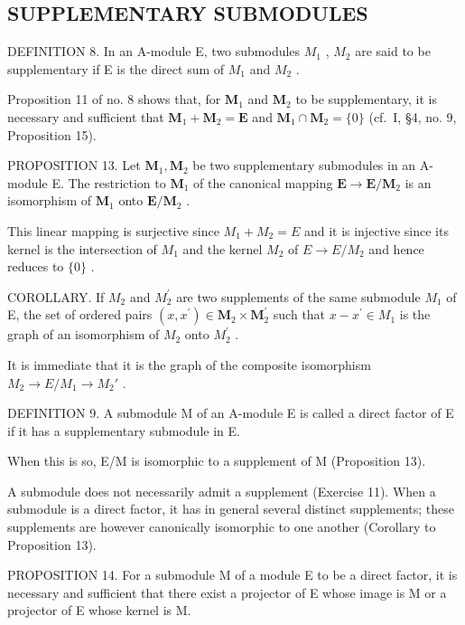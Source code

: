 \subsection{SUPPLEMENTARY SUBMODULES}

DEFINITION 8. In an A-module E, two submodules \(M_{1}\) , \(M_{2}\) are said to be supplementary if E is the direct sum of \(M_{1}\) and \(M_{2}\) .

Proposition 11 of no. 8 shows that, for \(\mathbf{M}_1\) and \(\mathbf{M}_2\) to be supplementary, it is necessary and sufficient that \(\mathbf{M}_1 + \mathbf{M}_2 = \mathbf{E}\) and \(\mathbf{M}_1 \cap \mathbf{M}_2 = \{0\}\) (cf.~I, §4, no. 9, Proposition 15).

PROPOSITION 13. Let \(\mathbf{M}_1, \mathbf{M}_2\) be two supplementary submodules in an A-module E. The restriction to \(\mathbf{M}_1\) of the canonical mapping \(\mathbf{E} \to \mathbf{E} / \mathbf{M}_2\) is an isomorphism of \(\mathbf{M}_1\) onto \(\mathbf{E} / \mathbf{M}_2\) .

This linear mapping is surjective since \(M_{1} + M_{2} = E\) and it is injective since its kernel is the intersection of \(M_{1}\) and the kernel \(M_{2}\) of \(E \rightarrow E/M_{2}\) and hence reduces to \(\{0\}\) .

COROLLARY. If \(M_{2}\) and \(M_{2}^{\prime}\) are two supplements of the same submodule \(M_{1}\) of E, the set of ordered pairs \((x, x^{\prime}) \in \mathbf{M}_{2} \times \mathbf{M}_{2}^{\prime}\) such that \(x - x^{\prime} \in M_{1}\) is the graph of an isomorphism of \(M_{2}\) onto \(M_{2}^{\prime}\) .

It is immediate that it is the graph of the composite isomorphism \(M_{2} \rightarrow E/M_{1} \rightarrow M_{2}'\) .

DEFINITION 9. A submodule M of an A-module E is called a direct factor of E if it has a supplementary submodule in E.

When this is so, E/M is isomorphic to a supplement of M (Proposition 13).

A submodule does not necessarily admit a supplement (Exercise 11). When a submodule is a direct factor, it has in general several distinct supplements; these supplements are however canonically isomorphic to one another (Corollary to Proposition 13).

PROPOSITION 14. For a submodule M of a module E to be a direct factor, it is necessary and sufficient that there exist a projector of E whose image is M or a projector of E whose kernel is M.

